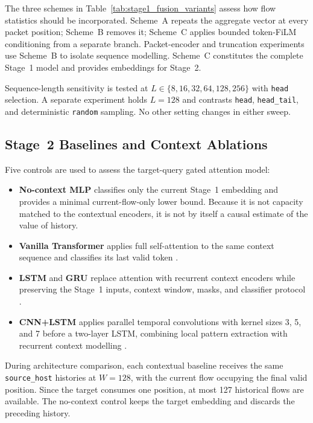 \documentclass[11pt,fleqn]{report}
\begin{document}
The three schemes in Table~\ref{tab:stage1_fusion_variants} assess how flow statistics should be incorporated. Scheme~A repeats the aggregate vector at every packet position; Scheme~B removes it; Scheme~C applies bounded token-FiLM conditioning from a separate branch. Packet-encoder and truncation experiments use Scheme~B to isolate sequence modelling. Scheme~C constitutes the complete Stage~1 model and provides embeddings for Stage~2.

Sequence-length sensitivity is tested at $L\in\{8,16,32,64,128,256\}$ with \texttt{head} selection. A separate experiment holds $L=128$ and contrasts \texttt{head}, \texttt{head\_tail}, and deterministic \texttt{random} sampling. No other setting changes in either sweep.

\subsection{Stage~2 Baselines and Context Ablations}
\label{subsubsec:stage2_baseline_protocol}

Five controls are used to assess the target-query gated attention model:

\begin{itemize}[leftmargin=*]
    \item \textbf{No-context MLP} classifies only the current Stage~1 embedding and provides a minimal current-flow-only lower bound. Because it is not capacity matched to the contextual encoders, it is not by itself a causal estimate of the value of history.

    \item \textbf{Vanilla Transformer} applies full self-attention to the same context sequence and classifies its last valid token \cite{Vaswani2017}.

    \item \textbf{LSTM} and \textbf{GRU} replace attention with recurrent context encoders while preserving the Stage~1 inputs, context window, masks, and classifier protocol \cite{Hochreiter1997LSTM,Cho2014GRU}.

    \item \textbf{CNN+LSTM} applies parallel temporal convolutions with kernel sizes 3, 5, and 7 before a two-layer LSTM, combining local pattern extraction with recurrent context modelling \cite{Kim2014CNN,Hochreiter1997LSTM}.
\end{itemize}

During architecture comparison, each contextual baseline receives the same \texttt{source\_host} histories at $W=128$, with the current flow occupying the final valid position. Since the target consumes one position, at most 127 historical flows are available. The no-context control keeps the target embedding and discards the preceding history.
\end{document}
